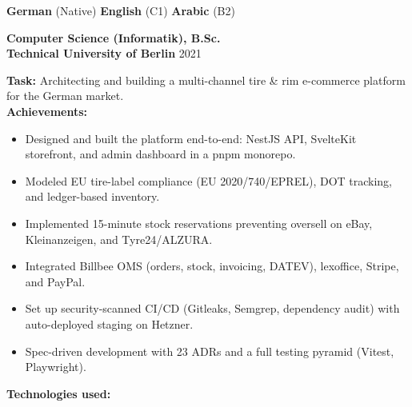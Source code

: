 \documentclass[10pt,a4paper,normalphoto]{altacv}
\begin{document}
\begin{fullwidth}
\noindent
\begin{minipage}[t]{0.47\linewidth}
\textcolor{emphasis}{\textbf{German}} (Native)\quad
\textcolor{emphasis}{\textbf{English}} (C1)\quad
\textcolor{emphasis}{\textbf{Arabic}} (B2)
\end{minipage}%
\hfill
\begin{minipage}[t]{0.47\linewidth}
\textcolor{emphasis}{\textbf{Computer Science (Informatik), B.Sc.}}\\
\textcolor{accent}{\textbf{Technical University of Berlin}} \textperiodcentered{} 2021
\end{minipage}


\textbf{Task:} Architecting and building a multi-channel tire \& rim e-commerce platform for the German market.\\
\textbf{Achievements:}
\begin{itemize}
    \item Designed and built the platform end-to-end: NestJS API, SvelteKit storefront, and admin dashboard in a pnpm monorepo.
    \item Modeled EU tire-label compliance (EU 2020/740/EPREL), DOT tracking, and ledger-based inventory.
    \item Implemented 15-minute stock reservations preventing oversell on eBay, Kleinanzeigen, and Tyre24/ALZURA.
    \item Integrated Billbee OMS (orders, stock, invoicing, DATEV), lexoffice, Stripe, and PayPal.
    \item Set up security-scanned CI/CD (Gitleaks, Semgrep, dependency audit) with auto-deployed staging on Hetzner.
    \item Spec-driven development with 23 ADRs and a full testing pyramid (Vitest, Playwright).
\end{itemize}

\textbf{Technologies used:}\\[0.4em]

\vspace{1em}
\end{fullwidth}
\end{document}
